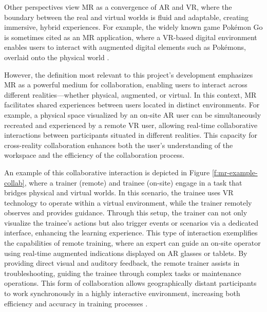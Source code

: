     Other perspectives view \ac{MR} as a convergence of \ac{AR} and \ac{VR}, where the boundary between the real and virtual worlds is fluid and adaptable, creating immersive, hybrid experiences. For example, the widely known game Pokémon Go is sometimes cited as an \ac{MR} application, where a \ac{VR}-based digital environment enables users to interact with augmented digital elements such as Pokémons, overlaid onto the physical world \cite{whatismixedreality}.

    However, the definition most relevant to this project's development emphasizes \ac{MR} as a powerful medium for collaboration, enabling users to interact across different realities—whether physical, augmented, or virtual. In this context, \ac{MR} facilitates shared experiences between users located in distinct environments. For example, a physical space visualized by an on-site \ac{AR} user can be simultaneously recreated and experienced by a remote \ac{VR} user, allowing real-time collaborative interactions between participants situated in different realities. This capacity for cross-reality collaboration enhances both the user’s understanding of the workspace and the efficiency of the collaboration process.

    An example of this collaborative interaction is depicted in Figure \ref{f:mr-example-collab}, where a trainer (remote) and trainee (on-site) engage in a task that bridges physical and virtual worlds. In this scenario, the trainee uses \ac{VR} technology to operate within a virtual environment, while the trainer remotely observes and provides guidance. Through this setup, the trainer can not only visualize the trainee's actions but also trigger events or scenarios via a dedicated interface, enhancing the learning experience. This type of interaction exemplifies the capabilities of remote training, where an expert can guide an on-site operator using real-time augmented indications displayed on \ac{AR} glasses or tablets. By providing direct visual and auditory feedback, the remote trainer assists in troubleshooting, guiding the trainee through complex tasks or maintenance operations. This form of collaboration allows geographically distant participants to work synchronously in a highly interactive environment, increasing both efficiency and accuracy in training processes \cite{Mayer2023}.
  
